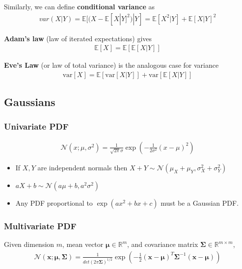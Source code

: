 \documentclass{harvardml}
\theoremstyle{definition}
\theoremstyle{plain}
\newcommand{\R}{\mathbb{R}}
\newcommand{\E}{\mathbb{E}}
\newcommand{\var}{\text{var}}
\renewcommand{\v}[1]{\mathbf{#1}}
\begin{document}
		\noindent Similarly, we can define \textbf{conditional variance} as
		\begin{align*}
			var(X|Y) = \E[(X - \E[X|Y]^{2}) | Y] = \E[X^2|Y] + \E[X|Y]^2
		\end{align*}
		
		\noindent \textbf{Adam's law} (law of iterated expectations) gives
		\begin{align*}
			\E[X]=\E[\E[X|Y]]
		\end{align*}

		\noindent \textbf{Eve's Law} (or law of total variance) is the 
		analogous case for variance
		\begin{align*}
  			\var[X] = \E[ \var[X|Y] ] + \var[ \E[X | Y] ]
		\end{align*}



	\subsection{Gaussians}
		\subsubsection{Univariate PDF}
			\begin{align*}
				\mathcal{N}(x; \mu, \sigma^2) = 
				\frac{1}{\sqrt{2\pi}\sigma} 
				\exp\left( -\frac{1}{2\sigma^2} (x - \mu)^2 \right)
			\end{align*}

		\begin{itemize}
			\item If $X,Y$ are independent normals then $X + Y \sim 
				  \mathcal{N}(\mu_X + \mu_Y, \sigma_X^2 + \sigma_Y^2)$
			\item $aX+b \sim \mathcal{N}(a\mu + b, a^2 \sigma^2)$
			\item Any PDF proportional to $\exp(ax^2 + bx + c)$ 
				  must be a Gaussian PDF.
		\end{itemize}

		\subsubsection{Multivariate PDF}
		Given dimension $m$, mean vector $\v \mu \in \R^m$,
        and covariance matrix $\v \Sigma \in \R^{m \times m}$,
		\begin{align*}
            \mathcal{N}(\v x ; \v \mu, \v \Sigma) = 
                        \frac{1}{det(2\pi\v \Sigma)^{1/2}}
			            \exp \left( -\frac{1}{2} (\v x - \v \mu)^T 
						\v \Sigma^{-1} 
                        (\v x - \v \mu) \right)
		\end{align*}
\end{document}
